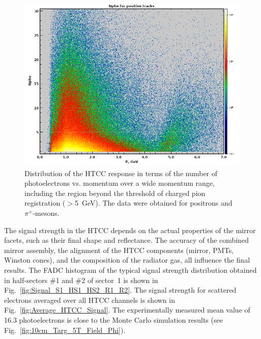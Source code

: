 \begin{figure}[!ht]
    \centering
    \includegraphics[width=1.0\linewidth,trim={0.0cm 0.0cm 0.0cm 0.0cm},clip]{images/positivePNPEC6595.png}
    \caption{Distribution of the HTCC response in terms of the number of photoelectrons vs. momentum over a wide
      momentum range, including the region beyond the threshold of charged pion registration ($>$5~GeV). The data
      were obtained for positrons and $\pi^+$-mesons.}
    \label{fig:positivePNPEC6595}
\end{figure}

The signal strength in the HTCC depends on the actual properties of the mirror facets, such as their final shape
and reflectance. The accuracy of the combined mirror assembly, the alignment of the HTCC components (mirror,
PMTs, Winston cones), and the composition of the radiator gas, all influence the final results. The FADC histogram of
the typical signal strength distribution obtained in half-sectors \#1 and \#2 of sector~1 is shown in
Fig.~\ref{fig:Signal_S1_HS1_HS2_R1_R2}. The signal strength for scattered electrons averaged over all HTCC
channels is shown in Fig.~\ref{fig:Average_HTCC_Signal}. The experimentally measured mean value of 16.3
photoelectrons is close to the Monte Carlo simulation results (see Fig.~\ref{fig:10cm_Targ_5T_Field_Phi}).

